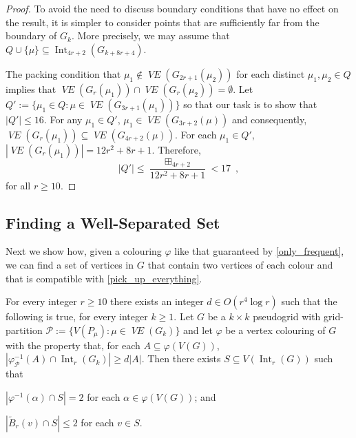 \documentclass{patmorin}
\newcommand{\vol}[1]{\boxplus_{#1}}
\DeclareMathOperator{\interior}{Int}
\DeclareMathOperator{\VE}{\mathit{VE}}
\begin{document}
\begin{proof}
  To avoid the need to discuss boundary conditions that have no effect on the result, it is simpler to consider points that are sufficiently far from the boundary of $G_k$. More precisely, we may assume that $Q\cup\{\mu\}\subseteq\interior_{4r+2}(G_{k+8r+4})$.

  The packing condition that $\mu_1\not\in \VE(G_{2r+1}(\mu_2))$ for each distinct $\mu_1,\mu_2\in Q$ implies that $\VE(G_{r}(\mu_1))\cap \VE(G_{r}(\mu_2))=\emptyset$.  Let $Q':=\{\mu_1\in Q: \mu\in \VE(G_{3r+1}(\mu_1))\}$ so that our task is to show that $|Q'|\le 16$.  For any $\mu_1\in Q'$,
  $\mu_1\in\VE(G_{3r+2}(\mu))$ and consequently, $\VE(G_{r}(\mu_1))\subseteq \VE(G_{4r+2}(\mu))$.  For each $\mu_1\in Q'$, $|\VE(G_r(\mu_1))|= 12r^2+8r+1$.  Therefore,
  \[  |Q'|\le \frac{\vol{4r+2}}{12r^2+8r+1} < 17 \enspace ,
  \]
  for all $r\ge 10$.
\end{proof}


\subsection{Finding a Well-Separated Set}
\label{well_separated}

Next we show how, given a colouring $\varphi$ like that guaranteed by \cref{only_frequent}, we can find a set of vertices in $G$ that contain two vertices of each colour and that is compatible with \cref{pick_up_everything}.

\begin{lem}\label{doubled_colour_set}
  For every integer $r\ge 10$ there exists an integer $d\in O(r^4\log r)$ such that the following is true, for every integer $k\ge 1$.\newline
  Let $G$ be a $k\times k$ pseudogrid with grid-partition $\mathcal{P}:=\{V(P_\mu):\mu\in\VE(G_k)\}$ and let $\varphi$ be a vertex colouring of $G$ with the property that, for each $A\subseteq\varphi(V(G))$, $|\varphi_{\mathcal{P}}^{-1}(A)\cap\interior_r(G_k)|\ge d|A|$.
  Then there exists $S\subseteq V(\interior_r(G))$ such that
  \begin{compactenum}[(i)]
    \item \label{hits_both} $|\varphi^{-1}(\alpha)\cap S|= 2$ for each $\alpha\in\varphi(V(G))$; and
    \item \label{spread_out} $|\tilde{B}_r(v)\cap S|\le 2$ for each $v\in S$.
  \end{compactenum}
\end{lem}
\end{document}
